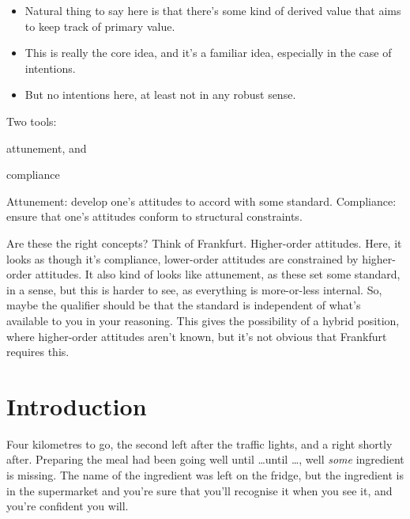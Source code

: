 \documentclass[10pt]{article}
\begin{document}
\begin{itemize}
\item Natural thing to say here is that there's some kind of derived value that aims to keep track of primary value.
\item This is really the core idea, and it's a familiar idea, especially in the case of intentions.
\item But no intentions here, at least not in any robust sense.
\end{itemize}





\newpage

Two tools:
\begin{enumerate*}
\item attunement, and
\item compliance
\end{enumerate*}

Attunement: develop one's attitudes to accord with some standard.
Compliance: ensure that one's attitudes conform to structural constraints.

Are these the right concepts?
Think of Frankfurt.
Higher-order attitudes.
Here, it looks as though it's compliance, lower-order attitudes are constrained by higher-order attitudes.
It also kind of looks like attunement, as these set some standard, in a sense, but this is harder to see, as everything is more-or-less internal.
So, maybe the qualifier should be that the standard is independent of what's available to you in your reasoning.
This gives the possibility of a hybrid position, where higher-order attitudes aren't known, but it's not obvious that Frankfurt requires this.


\newpage
\maketitle

\section{Introduction}
\label{sec:introduction}

Four kilometres to go, the second left after the traffic lights, and a right shortly after.
Preparing the meal had been going well until \dots until \dots, well \emph{some} ingredient is missing.
The name of the ingredient was left on the fridge, but the ingredient is in the supermarket and you're sure that you'll recognise it when you see it, and you're confident you will.
\end{document}
